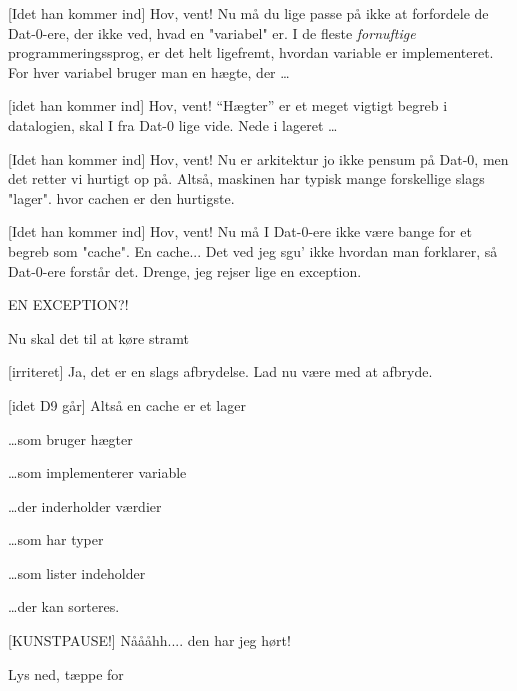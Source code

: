 \documentclass[a4paper,11pt]{article}
\begin{document}
\begin{sketch}
   [Idet han kommer ind] Hov, vent!  Nu må du lige passe på ikke at forfordele de Dat-0-ere,
  der ikke ved, hvad en "variabel" er.  I de fleste {\em fornuftige}
  programmeringssprog, er det helt ligefremt, hvordan variable er
  implementeret.  For hver variabel bruger man en hægte, der \ldots
  
   [idet han kommer ind] Hov, vent! 
  ``Hægter'' er et meget vigtigt begreb i datalogien, skal I fra Dat-0
  lige vide. Nede i lageret \ldots
  
   [Idet han kommer ind] Hov, vent!  Nu er arkitektur jo ikke pensum på Dat-0, men det retter
  vi hurtigt op på. Altså, maskinen har typisk mange forskellige slags
  "lager". hvor cachen er den hurtigste.
  
   [Idet han kommer ind] Hov, vent!  Nu
  må I Dat-0-ere ikke være bange for et begreb som "cache".  En
  cache...   Det ved jeg sgu' ikke hvordan man
  forklarer, så Dat-0-ere forstår det.  Drenge, jeg rejser lige en
  exception.
  
   EN EXCEPTION?!
  
  \scene Nu skal det til at køre stramt
  
   [irriteret] Ja, det er en slags afbrydelse. Lad nu være
  med at afbryde. 
  
   [idet D9 går] Altså en cache er et lager 
  
   \ldots som bruger hægter 
  
   \ldots som implementerer variable 
  
   \ldots der inderholder værdier 
  
   \ldots som har typer 
  
   \ldots som lister indeholder 
  
   \ldots der kan sorteres. 

   [KUNSTPAUSE!] Nåååhh.... den har jeg hørt!

  \scene Lys ned, tæppe for

\end{sketch}
\end{document}
